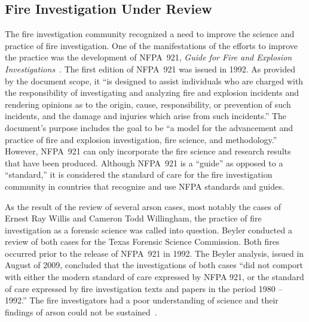 \documentclass[twoside]{uocthesis}
\begin{document}
\subsection{Fire Investigation Under Review}
The fire investigation community recognized a need to improve the science and practice of fire investigation.  One of the manifestations of the efforts to improve the practice was the development of NFPA~921, {\em Guide for Fire and Explosion Investigations}~\cite{NFPA:921}.  The first edition of NFPA~921 was issued in 1992.  As provided by the document scope, it ``is designed to assist individuals who are charged with the responsibility of investigating and analyzing fire and explosion incidents and rendering opinions as to the origin, cause, responsibility, or prevention of such incidents, and the damage and injuries which arise from such incidents.'' The document’s purpose includes the goal to be ``a model for the advancement and practice of fire and explosion investigation, fire science, and methodology.'' However, NFPA~921 can only incorporate the fire science and research results that have been produced.  Although NFPA~921 is a ``guide'' as opposed to a ``standard,'' it is considered the standard of care for the fire investigation community in countries that recognize and use NFPA standards and guides.

As the result of the review of several arson cases, most notably the cases of Ernest Ray Willis and Cameron Todd Willingham, the practice of fire investigation as a forensic science was called into question.  Beyler conducted a review of both cases for the Texas Forensic Science Commission.  Both fires occurred prior to the release of NFPA~921 in 1992.  The Beyler analysis, issued in August of 2009, concluded that the investigations of both cases ``did not comport with either the modern standard of care expressed by NFPA 921, or the standard of care expressed by fire investigation texts and papers in the period 1980 – 1992.'' The fire investigators had a poor understanding of science and their findings of arson could not be sustained~\cite{Beyler:2009}.
\end{document}
